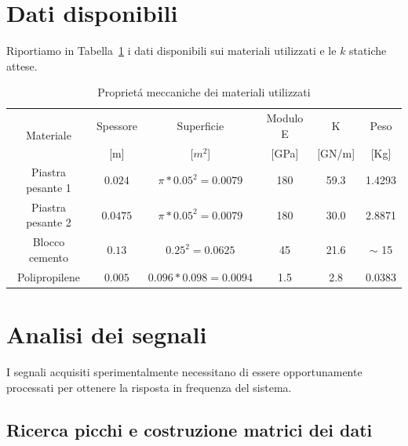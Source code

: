 \documentclass[12pt,a4paper]{article}
\begin{document}
\section{Dati disponibili}
	Riportiamo in Tabella~\ref{tab:material}  i dati disponibili sui materiali utilizzati e le $k$ statiche attese.
	

	
	


\begin{table}[]
	\centering
	\caption{Propriet\'a meccaniche dei materiali utilizzati}
	\label{tab:material}
	\begin{tabular}{cccccc}
		\hline\hline
		\multirow{2}{*}{Materiale} & Spessore&Superficie&Modulo E & K&Peso\\
		&[m]& [$m^2$]& [GPa]&[GN/m]& [Kg]\\
		\hline
		Piastra pesante 1&$0.024$	& $\pi* 0.05^2=0.0079$	& 180	& 59.3	& 1.4293	\\
		Piastra pesante 2&$0.0475$	& $\pi* 0.05^2=0.0079$	& 180	& 30.0	& 2.8871	\\
		Blocco cemento	&$0.13 $	& $0.25^2=0.0625$		& 45 	& 21.6	& $\sim$ 15	\\
		Polipropilene	&$0.005$	& $0.096*0.098=0.0094$	& 1.5	&  2.8	& 0.0383	\\
		\hline\hline
	\end{tabular}
\end{table}



 \section{Analisi dei segnali}
 I segnali acquisiti sperimentalmente necessitano di essere opportunamente processati per ottenere la risposta in frequenza del sistema.
 \subsection{Ricerca picchi e costruzione matrici dei dati}
 
\end{document}
